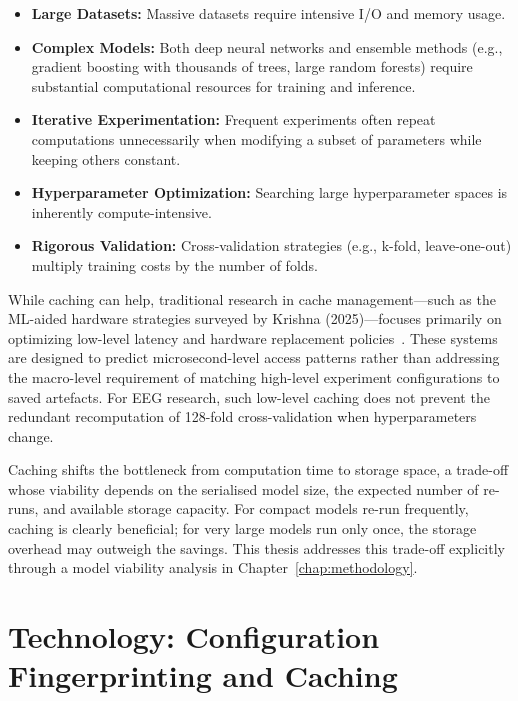 \begin{itemize}
 \item \textbf{Large Datasets:} Massive datasets require intensive I/O and memory usage.
 \item \textbf{Complex Models:} Both deep neural networks and ensemble methods (e.g., gradient boosting with thousands of trees, large random forests) require substantial computational resources for training and inference.
 \item \textbf{Iterative Experimentation:} Frequent experiments often repeat computations unnecessarily when modifying a subset of parameters while keeping others constant.
 \item \textbf{Hyperparameter Optimization:} Searching large hyperparameter spaces is inherently compute-intensive.
 \item \textbf{Rigorous Validation:} Cross-validation strategies (e.g., k-fold, leave-one-out) multiply training costs by the number of folds.
\end{itemize}

While caching can help, traditional research in cache management—such as the ML-aided hardware strategies surveyed by Krishna (2025)—focuses primarily on optimizing low-level latency and hardware replacement policies~\cite{krishna2025cache}. These systems are designed to predict microsecond-level access patterns rather than addressing the macro-level requirement of matching high-level experiment configurations to saved artefacts. For EEG research, such low-level caching does not prevent the redundant recomputation of 128-fold cross-validation when hyperparameters change.

Caching shifts the bottleneck from computation time to storage space, a trade-off whose viability depends on the serialised model size, the expected number of re-runs, and available storage capacity. For compact models re-run frequently, caching is clearly beneficial; for very large models run only once, the storage overhead may outweigh the savings. This thesis addresses this trade-off explicitly through a model viability analysis in Chapter~\ref{chap:methodology}.

\section{Technology: Configuration Fingerprinting and Caching}
\label{sec:fingerprinting}

